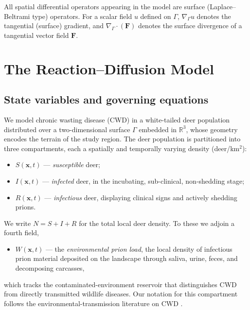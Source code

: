 \documentclass[11pt]{article}
\newcommand{\Grad}{\nabla_\Gamma}
\newcommand{\Div}{\nabla_\Gamma\cdot}
\begin{document}
All spatial differential operators appearing in the model are surface (Laplace--Beltrami type) operators. For a scalar field $u$ defined on $\Gamma$, $\Grad u$ denotes the tangential (surface) gradient, and $\Div(\mathbf{F})$ denotes the surface divergence of a tangential vector field $\mathbf{F}$.

\section{The Reaction--Diffusion Model}
\label{sec:model}

\subsection{State variables and governing equations}

We model chronic wasting disease (CWD) in a white-tailed deer population distributed over a two-dimensional surface $\Gamma$ embedded in $\mathbb{R}^3$, whose geometry encodes the terrain of the study region. The deer population is partitioned into three compartments, each a spatially and temporally varying density (deer/km$^2$):
\begin{itemize}
  \item $S(\mathbf{x},t)$ --- \emph{susceptible} deer;
  \item $I(\mathbf{x},t)$ --- \emph{infected} deer, in the incubating, sub-clinical, non-shedding stage;
  \item $R(\mathbf{x},t)$ --- \emph{infectious} deer, displaying clinical signs and actively shedding prions.
\end{itemize}
We write $N = S + I + R$ for the total local deer density. To these we adjoin a fourth field,
\begin{itemize}
  \item $W(\mathbf{x},t)$ --- the \emph{environmental prion load}, the local density of infectious prion material deposited on the landscape through saliva, urine, feces, and decomposing carcasses,
\end{itemize}
which tracks the contaminated-environment reservoir that distinguishes CWD from directly transmitted wildlife diseases. Our notation for this compartment follows the environmental-transmission literature on CWD \citep{Almberg2011}.
\end{document}
